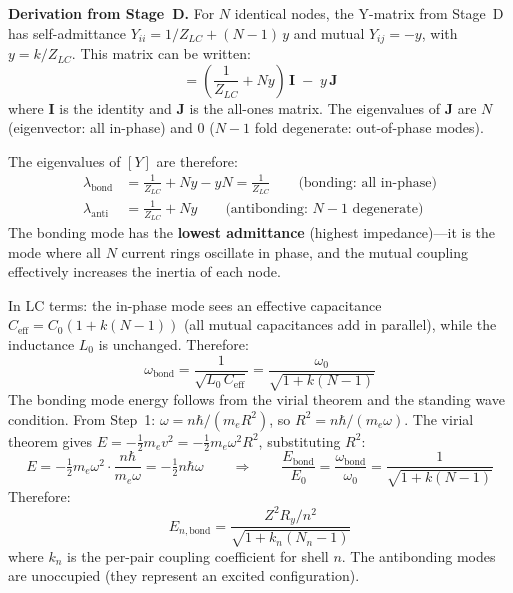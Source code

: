 \noindent\textbf{Derivation from Stage~D.}
For $N$ identical nodes, the Y-matrix from Stage~D has
self-admittance $Y_{ii} = 1/Z_{LC} + (N{-}1)\,y$ and
mutual $Y_{ij} = -y$, with $y = k/Z_{LC}$.
This matrix can be written:
\begin{equation}
    [Y] = \left(\frac{1}{Z_{LC}} + Ny\right)\,\mathbf{I}
    \;-\; y\,\mathbf{J}
\end{equation}
where $\mathbf{I}$ is the identity and $\mathbf{J}$
is the all-ones matrix.  The eigenvalues of $\mathbf{J}$
are $N$ (eigenvector: all in-phase) and $0$ ($N{-}1$ fold
degenerate: out-of-phase modes).

The eigenvalues of $[Y]$ are therefore:
\begin{align}
    \lambda_{\text{bond}} &= \frac{1}{Z_{LC}} + Ny - yN
    = \frac{1}{Z_{LC}}
    \qquad\text{(bonding: all in-phase)} \\
    \lambda_{\text{anti}} &= \frac{1}{Z_{LC}} + Ny
    \qquad\text{(antibonding: $N{-}1$ degenerate)}
\end{align}
The bonding mode has the \textbf{lowest admittance}
(highest impedance)---it is the mode where all $N$
current rings oscillate in phase, and the mutual
coupling effectively increases the inertia of each node.

In LC terms: the in-phase mode sees an effective
capacitance $C_{\text{eff}} = C_0(1 + k(N{-}1))$
(all mutual capacitances add in parallel), while the
inductance $L_0$ is unchanged.  Therefore:
\begin{equation}
    \omega_{\text{bond}}
    = \frac{1}{\sqrt{L_0\,C_{\text{eff}}}}
    = \frac{\omega_0}{\sqrt{1 + k(N{-}1)}}
    \label{eq:omega_bond_derived}
\end{equation}
The bonding mode energy follows from the virial
theorem and the standing wave condition.
From Step~1: $\omega = n\hbar/(m_e R^2)$,
so $R^2 = n\hbar/(m_e\omega)$.
The virial theorem gives
$E = -\tfrac{1}{2}m_e v^2 = -\tfrac{1}{2}m_e\omega^2 R^2$,
substituting $R^2$:
\begin{equation}
    E = -\tfrac{1}{2}m_e\omega^2 \cdot \frac{n\hbar}{m_e\omega}
    = -\tfrac{1}{2}n\hbar\omega
    \qquad\Longrightarrow\qquad
    \frac{E_{\text{bond}}}{E_0}
    = \frac{\omega_{\text{bond}}}{\omega_0}
    = \frac{1}{\sqrt{1 + k(N{-}1)}}
\end{equation}
Therefore:
\begin{equation}
    E_{n,\text{bond}} = \frac{Z^2 R_y / n^2}
    {\sqrt{1 + k_n(N_n - 1)}}
    \label{eq:bonding_mode}
\end{equation}
where $k_n$ is the per-pair coupling coefficient for shell $n$.
The antibonding modes are unoccupied
(they represent an excited configuration).

